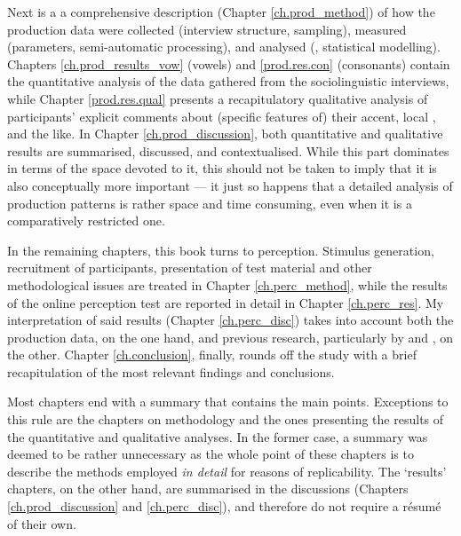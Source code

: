Next is a a comprehensive description (Chapter \ref{ch.prod_method}) of how the production data were collected (interview structure, sampling), measured (parameters, semi-auto\-matic processing), and analysed (, statistical modelling).
Chapters \ref{ch.prod_results_vow} (vowels) and \ref{prod.res.con} (consonants) contain the quantitative analysis of the data gathered from the sociolinguistic interviews, while Chapter \ref{prod.res.qual} presents a recapitulatory qualitative analysis of participants' explicit comments about (specific features of) their accent, local , and the like.
In Chapter \ref{ch.prod_discussion}, both quantitative and qualitative results are summarised, discussed, and contextualised.
While this part dominates in terms of the space devoted to it, this should not be taken to imply that it is also conceptually more important --- it just so happens that a detailed analysis of production patterns is rather space and time consuming, even when it is a comparatively restricted one.

In the remaining chapters, this book turns to perception.
Stimulus generation, recruitment of participants, presentation of test material and other methodological issues are treated in Chapter \ref{ch.perc_method}, while the results of the online perception test are reported in detail in Chapter \ref{ch.perc_res}.
My interpretation of said results (Chapter \ref{ch.perc_disc}) takes into account both the production data, on the one hand, and previous research, particularly by \textcite{hayetal2006a} and \textcite{haydrager2010}, on the other.
Chapter \ref{ch.conclusion}, finally, rounds off the study with a brief recapitulation of the most relevant findings and conclusions.

Most chapters end with a summary that contains the main points.
Exceptions to this rule are the chapters on methodology and the ones presenting the results of the quantitative and qualitative analyses.
In the former case, a summary was deemed to be rather unnecessary as the whole point of these chapters is to describe the methods employed \emph{in detail} for reasons of replicability.
The `results' chapters, on the other hand, are summarised in the discussions (Chapters \ref{ch.prod_discussion} and \ref{ch.perc_disc}), and therefore do not require a résumé of their own.